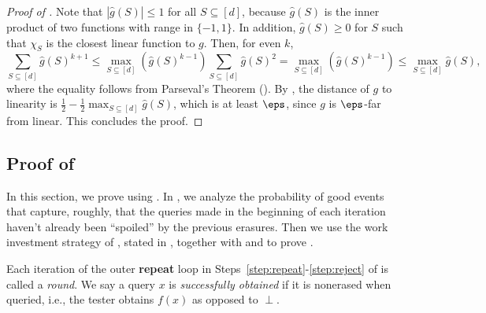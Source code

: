\documentclass{toc}
\begin{document}
\begin{proof}[Proof of ]
  Note that $|\widehat{g}(S)| \leq 1$ for all $S \subseteq [d]$, because $\widehat{g}(S)$ is the inner product of two functions with range in $\{-1, 1\}$. In addition,  $\widehat{g}(S) \geq 0$ for $S$ such that $\chi_S$ is the closest linear function to $g$. Then, for even $k$,
  \begin{equation*}
      \sum_{S \subseteq [d]} \widehat{g}(S)^{k+1} \leq \max_{S \subseteq [d]} (\widehat{g}(S)^{k-1}) \sum_{S \subseteq [d]} \widehat{g}(S)^{2} = \max_{S \subseteq [d]} (\widehat{g}(S)^{k-1}) \leq \max_{S \subseteq [d]} \widehat{g}(S),
  \end{equation*}
where the equality follows from Parseval's Theorem (). By , the distance of $g$ to linearity is $\frac{1}{2} - \frac{1}{2} \max_{S \subseteq [d]} \widehat{g}(S)$, 
which is at least $\eps$, since $g$ is $\eps$-far from linear. This concludes the proof.
\end{proof}


\subsection{Proof of } \label{sec:linearity_proof}

In this section, we prove  using . In , we analyze the probability of good events that capture, roughly, that the queries made in the beginning of each iteration haven't already been ``spoiled'' by the previous erasures.
Then we use the work investment strategy of \cite{BermanRY14}, stated in , 
together with  and  to prove .  


Each iteration of the outer \textbf{repeat} loop in Steps~\ref{step:repeat}-\ref{step:reject} of  is called a {\em round}. We say a query $x$ is {\em successfully obtained} if it is nonerased when queried, i.e., the tester obtains $f(x)$ as opposed to $\perp$. 
\end{document}
